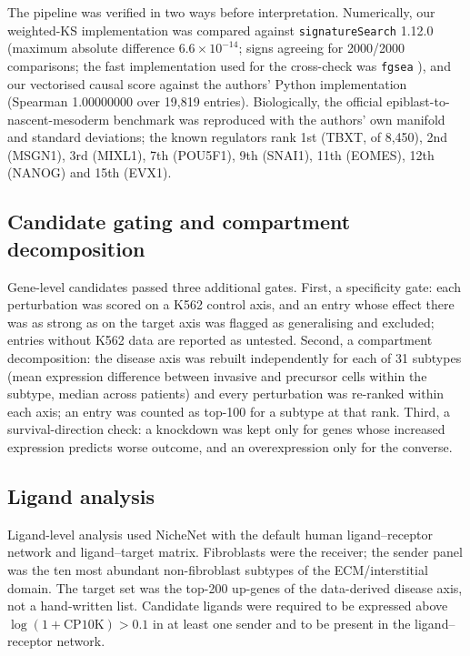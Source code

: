 The pipeline was verified in two ways before interpretation. Numerically, our weighted-KS
implementation was compared against \texttt{signatureSearch} 1.12.0
(maximum absolute difference $6.6\times10^{-14}$; signs agreeing for 2000/2000
comparisons; the fast implementation used for the cross-check was \texttt{fgsea}
\citep{korotkevich2016fgsea}), and our vectorised causal score against the authors' Python
implementation
(Spearman 1.00000000 over 19,819 entries). Biologically, the official
epiblast-to-nascent-mesoderm benchmark was reproduced with the authors' own manifold and
standard deviations; the known regulators rank 1st (TBXT, of 8,450), 2nd (MSGN1), 3rd
(MIXL1), 7th (POU5F1), 9th (SNAI1), 11th (EOMES), 12th (NANOG) and 15th (EVX1).

\subsection{Candidate gating and compartment decomposition}

Gene-level candidates passed three additional gates. First, a specificity gate: each
perturbation was scored on a K562 control axis, and an entry whose effect there was as
strong as on the target axis was flagged as generalising and excluded; entries without
K562 data are reported as untested. Second, a compartment decomposition: the disease axis
was rebuilt independently for each of 31 subtypes (mean expression difference between
invasive and precursor cells within the subtype, median across patients) and every
perturbation was re-ranked within each axis; an entry was counted as top-100 for a subtype
at that rank. Third, a survival-direction check: a knockdown was kept only for genes whose
increased expression predicts worse outcome, and an overexpression only for the converse.

\subsection{Ligand analysis}

Ligand-level analysis used NicheNet \citep{browaeys2020nichenet} with the default human
ligand--receptor network and
ligand--target matrix. Fibroblasts were the receiver; the sender panel was the ten most
abundant non-fibroblast subtypes of the ECM/interstitial domain. The target set was the
top-200 up-genes of the data-derived disease axis, not a hand-written list. Candidate
ligands were required to be expressed above $\log(1+\text{CP10K})>0.1$ in at least one
sender and to be present in the ligand--receptor network.

